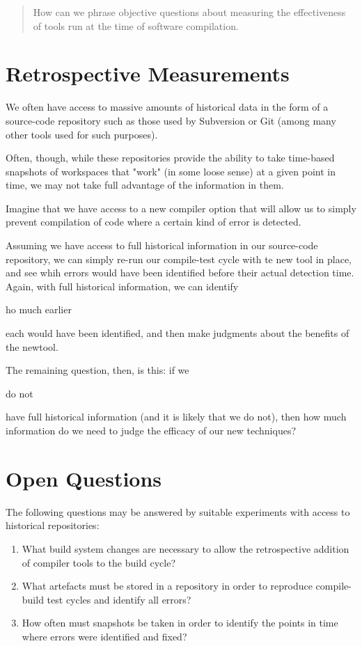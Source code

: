 \documentclass{eceasst}
\begin{document}
\begin{quote}
How can we phrase objective questions about measuring the effectiveness
of tools run at the time of software compilation.

\end{quote}

\section{Retrospective Measurements}

We often have access to massive amounts of historical data in the form
of a source-code repository such as those used by Subversion or Git
(among many other tools used for such purposes).

Often, though, while these repositories provide the ability to take
time-based snapshots of workspaces that "work" (in some loose sense) at
a given point in time, we may not take full advantage of the information
in them.

Imagine that we have access to a new compiler option that will allow
us to simply prevent compilation of code where a certain kind of error
is detected.

Assuming we have access to full historical information in our source-code
repository, we can simply re-run our compile-test cycle with te new
tool in place, and see whih errors would have been identified before
their actual detection time.  Again, with full historical information,
we can identify \begin{em}ho much earlier\end{em} each would have been
identified, and then make judgments about the benefits of the newtool.

The remaining question, then, is this: if we \begin{em}do not\end{em} have
full historical information (and it is likely that we do not), then how
much information do we need to judge the efficacy of our new techniques?

\section{Open Questions}

The following questions may be answered by suitable experiments with
access to historical repositories:

\begin{enumerate}
\item What build system changes are necessary to allow the retrospective
addition of compiler tools to the build cycle?

\item What artefacts must be stored in a repository in order to reproduce
compile-build test cycles and identify all errors?

\item How often must snapshots be taken in order to identify the points
in time where errors were identified and fixed?

\end{enumerate}



%
%
\end{document}
